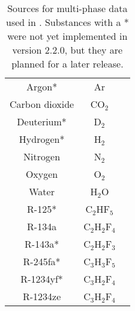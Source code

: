 \begin{table}
\centering
\caption{Sources for multi-phase data used in \PM.  Substances with a * were not yet implemented in version 2.2.0, but they are planned for a later release.}\label{tab:mp:source}
\begin{tabular}{|ccc|}
\hline
Argon* & Ar & \cite{tegeler:1999}\\
Carbon dioxide & CO$_2$ & \cite{span:1994}\\
Deuterium* & D$_2$ & \cite{richardson:2013}\\
Hydrogen* & H$_2$ & \cite{leachman:2009}\\
Nitrogen & N$_2$ & \cite{span:2000}\\
Oxygen & O$_2$ & \cite{stewart:1991}\\
Water & H$_2$O & \cite{iapws:2014}\\
R-125* & C$_2$HF$_5$ & \cite{piao:1998}\\
R-134a & C$_2$H$_2$F$_4$ & \cite{tilner:1994}\\
R-143a* & C$_2$H$_2$F$_3$ & \cite{lemmon:2000}\\
R-245fa* & C$_3$H$_3$F$_5$ & \cite{akasaka:2015}\\
R-1234yf* & C$_3$H$_2$F$_4$ & \cite{richter:2011}\\
R-1234ze & C$_3$H$_2$F$_4$ & \cite{thol:2016}\\
\hline
\end{tabular}
\end{table}
